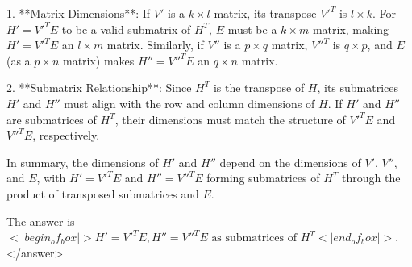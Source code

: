1. **Matrix Dimensions**: If \( V' \) is a \( k \times l \) matrix, its transpose \( V'^T \) is \( l \times k \). For \( H' = V'^T E \) to be a valid submatrix of \( H^T \), \( E \) must be a \( k \times m \) matrix, making \( H' = V'^T E \) an \( l \times m \) matrix. Similarly, if \( V'' \) is a \( p \times q \) matrix, \( V''^T \) is \( q \times p \), and \( E \) (as a \( p \times n \) matrix) makes \( H'' = V''^T E \) an \( q \times n \) matrix.  

2. **Submatrix Relationship**: Since \( H^T \) is the transpose of \( H \), its submatrices \( H' \) and \( H'' \) must align with the row and column dimensions of \( H \). If \( H' \) and \( H'' \) are submatrices of \( H^T \), their dimensions must match the structure of \( V'^T E \) and \( V''^T E \), respectively.  

In summary, the dimensions of \( H' \) and \( H'' \) depend on the dimensions of \( V' \), \( V'' \), and \( E \), with \( H' = V'^T E \) and \( H'' = V''^T E \) forming submatrices of \( H^T \) through the product of transposed submatrices and \( E \).  

The answer is \(<|begin_of_box|>H' = V'^T E, H'' = V''^T E \text{ as submatrices of } H^T<|end_of_box|>\).</answer>